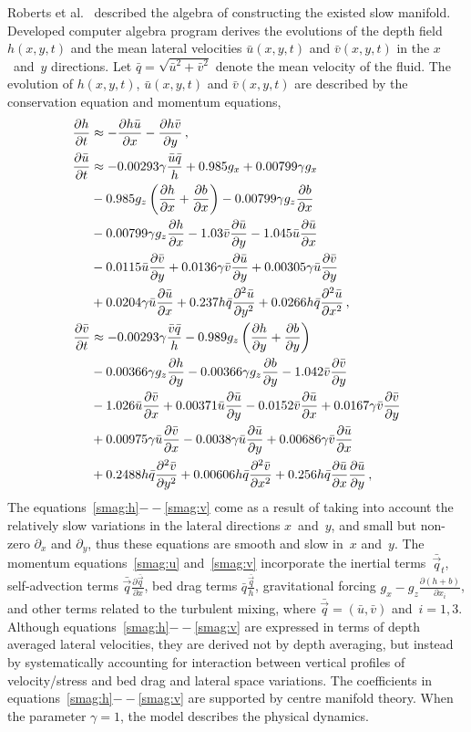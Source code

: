 \documentclass[a5paper,12pt]{article}
\newcommand{\uu}{{\bar u}}
\newcommand{\vv}{{\bar v}}
\newcommand{\bq}{{\bar q}}
\newcommand{\qq}{{\bar{\vec q}}}
\begin{document}
Roberts et al.~\cite{Roberts:2008fk} described the algebra of constructing the existed slow manifold. 
Developed computer algebra program derives the evolutions of the depth field $h(x,y,t)$ and the mean lateral velocities $\uu(x,y,t)$ and $\vv(x,y,t)$ in the $x$~and~$y$ directions. 
Let $\bq=\sqrt{\uu^2+\vv^2}$ denote the mean velocity of the fluid.
The evolution of $h(x,y,t)$, $\uu(x,y,t)$ and $\vv(x,y,t)$ are described by the conservation equation and momentum equations,
\begin{align}
\frac{\partial h}{\partial t}&
\approx-\frac{\partial h\bar u}{\partial x}-\frac{\partial h\bar v}{\partial y}\,,\label{smag:h}
\\
\frac{\partial\bar u}{\partial t}&
\approx-0.00293\gamma\frac{\bar u\bq}{h}+0.985g_x+0.00799\gamma g_x
\nonumber\\&
-0.985g_z\left(\frac{\partial h}{\partial x}+\frac{\partial b}{\partial x}\right)-0.00799\gamma g_z\D xb
\nonumber\\&
-0.00799\gamma g_z\D xh-1.03\bar v\frac{\partial\bar u}{\partial y}-1.045\bar u\frac{\partial\bar u}{\partial x}
\nonumber\\&
-0.0115\uu\D{y}{\vv}+0.0136\gamma\vv\D{y}{\uu}+0.00305\gamma\uu\D{y}{\vv}
\nonumber\\&
+0.0204\gamma\uu\D{x}{\uu}+0.237h\bq\DD y\uu+0.0266h\bq\DD x\uu\,,
\label{smag:u}
\\
\frac{\partial\bar v}{\partial t}&
\approx-0.00293\gamma\frac{\bar v\bq}{h}-0.989g_z\left(\frac{\partial h}{\partial y}+\frac{\partial b}{\partial y}\right)
\nonumber\\&
-0.00366\gamma g_z\D yh-0.00366\gamma g_z\D yb-1.042\bar v\frac{\partial\bar v}{\partial y}
\nonumber\\&
-1.026\bar u\frac{\partial\bar v}{\partial x}+0.00371\uu\D y\uu-0.0152\vv\D x\uu+0.0167\gamma\vv\D y\vv
\nonumber\\&
+0.00975\gamma\uu\D x\vv-0.0038\gamma\uu\D y\uu+0.00686\gamma\vv\D x\uu\nonumber\\&
+0.2488h\bq\DD y\vv+0.00606h\bq\DD x\vv+0.256h\bq\D x\uu\D y\uu
\,,\label{smag:v}
\end{align}
The equations~\eqref{smag:h}$--$\eqref{smag:v} come as a result of taking into account the relatively slow variations in the lateral directions $x$~and~$y$, and small but non-zero $\partial_x$ and $\partial_y$, thus these equations are smooth and slow in~$x$ and~$y$.  
The momentum equations~\eqref{smag:u} and~\eqref{smag:v} incorporate the inertial terms~$\qq_t$, self-advection terms $\qq\frac{\partial\qq}{\partial x}$, bed drag terms $\bq\frac{\qq}{h}$, gravitational forcing $g_x-g_z\frac{\partial(h+b)}{\partial x_i}$, and other terms related to the turbulent mixing, where $\qq=(\uu,\vv)$ and~$i=1,3$. 
Although equations~\eqref{smag:h}$--$\eqref{smag:v} are expressed in terms of depth averaged lateral velocities, they are derived not by depth averaging, but instead by systematically accounting for interaction between vertical profiles of velocity/stress and bed drag and lateral space variations. 
The coefficients in equations~\eqref{smag:h}$--$\eqref{smag:v} are supported by centre manifold theory. 
When the parameter $\gamma=1$, the model describes the physical dynamics.
\end{document}
